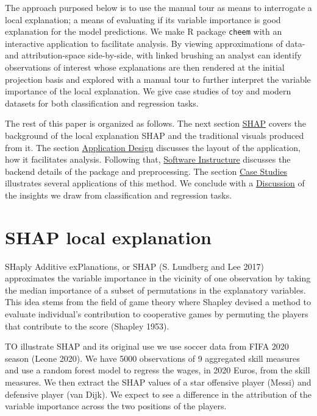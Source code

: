 \documentclass[
]{article}
\begin{document}
The approach purposed below is to use the manual tour as means to interrogate a local explanation; a means of evaluating if its variable importance is good explanation for the model predictions. We make R package \texttt{cheem} with an interactive application to facilitate analysis. By viewing approximations of data- and attribution-space side-by-side, with linked brushing an analyst can identify observations of interest whose explanations are then rendered at the initial projection basis and explored with a manual tour to further interpret the variable importance of the local explanation. We give case studies of toy and modern datasets for both classification and regression tasks.

The rest of this paper is organized as follows. The next section \protect\hyperlink{sec:SHAP}{SHAP} covers the background of the local explanation SHAP and the traditional visuals produced from it. The section \protect\hyperlink{sec:applicationdesign}{Application Design} discusses the layout of the application, how it facilitates analysis. Following that, \protect\hyperlink{sec:softwareinfrastructure}{Software Instructure} discusses the backend details of the package and preprocessing. The section \protect\hyperlink{sec:casestudies}{Case Studies} illustrates several applications of this method. We conclude with a \protect\hyperlink{sec:discussion}{Discussion} of the insights we draw from classification and regression tasks.

\hypertarget{sec:SHAP}{%
\section{SHAP local explanation}\label{sec:SHAP}}

SHaply Additive exPlanations, or SHAP (S. Lundberg and Lee 2017) approximates the variable importance in the vicinity of one observation by taking the median importance of a subset of permutations in the explanatory variables. This idea stems from the field of game theory where Shapley devised a method to evaluate individual's contribution to cooperative games by permuting the players that contribute to the score (Shapley 1953).

TO illustrate SHAP and its original use we use soccer data from FIFA 2020 season (Leone 2020). We have 5000 observations of 9 aggregated skill measures and use a random forest model to regress the wages, in 2020 Euros, from the skill measures. We then extract the SHAP values of a star offensive player (Messi) and defensive player (van Dijk). We expect to see a difference in the attribution of the variable importance across the two positions of the players.
\end{document}
